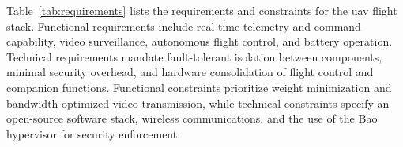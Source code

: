 


Table~\ref{tab:requirements} lists the requirements and constraints for the
\gls{uav} flight stack. Functional requirements include real-time telemetry and
command capability, video surveillance, autonomous flight control, and battery
operation. Technical requirements mandate fault-tolerant isolation between
components, minimal security overhead, and hardware consolidation of flight
control and companion functions. Functional constraints prioritize weight
minimization and bandwidth-optimized video transmission, while technical
constraints specify an open-source software stack, wireless communications,
and the use of the Bao hypervisor for security enforcement.

